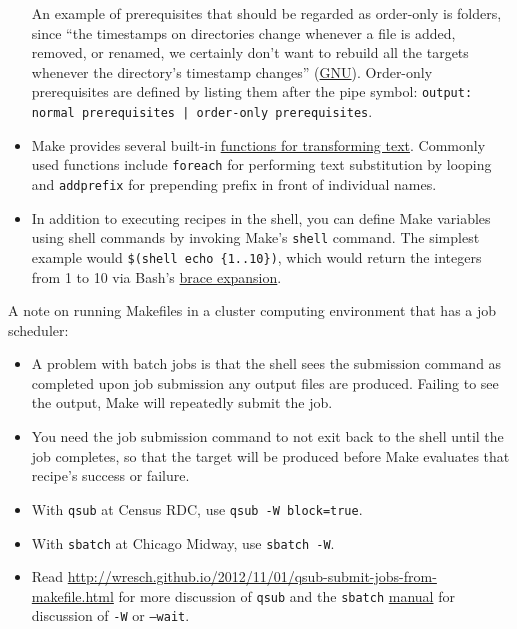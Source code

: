 \begin{itemize}
An example of prerequisites that should be regarded as order-only is folders, since ``the timestamps on directories change whenever a file is added, removed, or renamed, we certainly don’t want to rebuild all the targets whenever the directory’s timestamp changes'' (\href{https://www.gnu.org/software/make/manual/html_node/Prerequisite-Types.html}{GNU}). 
Order-only prerequisites are defined by listing them after the pipe symbol: \texttt{output: normal prerequisites | order-only prerequisites}.
\item Make provides several built-in \href{https://www.gnu.org/software/make/manual/html_node/Functions.html\#Functions}{functions for transforming text}.
Commonly used functions include \texttt{foreach} for performing text substitution by looping
and \texttt{addprefix} for prepending prefix in front of individual names.
\item In addition to executing recipes in the shell, you can define Make variables using shell commands by invoking Make's \texttt{shell} command.
The simplest example would \texttt{\$(shell echo \{1..10\})}, which would return the integers from 1 to 10 via Bash's \href{https://www.shell-tips.com/bash/seq-brace-expansion/}{brace expansion}.

\end{itemize}

A note on running Makefiles in a cluster computing environment that has a job scheduler:
\begin{itemize}
	\item A problem with batch jobs is that the shell sees the submission command as completed upon job submission any output files are produced.
	Failing to see the output, Make will repeatedly submit the job.
	\item You need the job submission command to not exit back to the shell until the job completes, so that the target will be produced before Make evaluates that recipe's success or failure.
	\item With \texttt{qsub} at Census RDC, use \texttt{qsub -W block=true}.
	\item With \texttt{sbatch} at Chicago Midway, use \texttt{sbatch -W}.
	\item Read \url{http://wresch.github.io/2012/11/01/qsub-submit-jobs-from-makefile.html} for more discussion of \texttt{qsub} and the \texttt{sbatch} \href{https://slurm.schedmd.com/sbatch.html}{manual} for discussion of \texttt{-W} or \texttt{--wait}.
\end{itemize}


